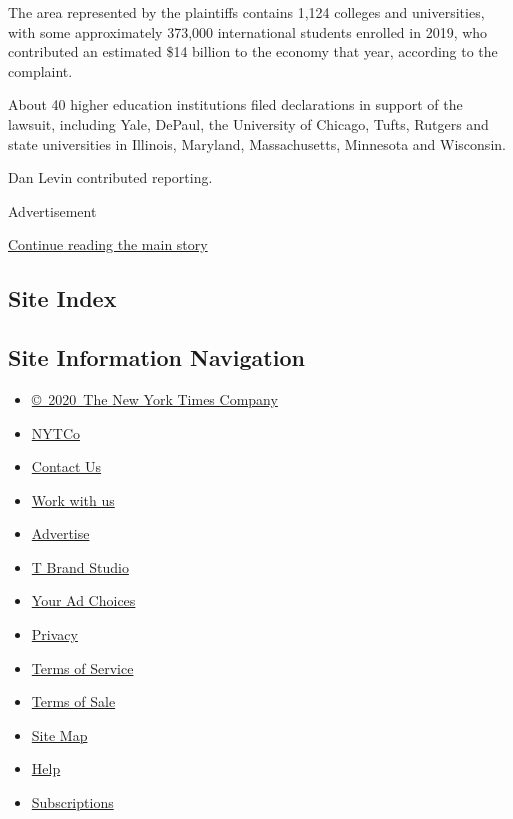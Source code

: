 The area represented by the plaintiffs contains 1,124 colleges and
universities, with some approximately 373,000 international students
enrolled in 2019, who contributed an estimated \$14 billion to the
economy that year, according to the complaint.

About 40 higher education institutions filed declarations in support of
the lawsuit, including Yale, DePaul, the University of Chicago, Tufts,
Rutgers and state universities in Illinois, Maryland, Massachusetts,
Minnesota and Wisconsin.

Dan Levin contributed reporting.

Advertisement

\protect\hyperlink{after-bottom}{Continue reading the main story}

\hypertarget{site-index}{%
\subsection{Site Index}\label{site-index}}

\hypertarget{site-information-navigation}{%
\subsection{Site Information
Navigation}\label{site-information-navigation}}

\begin{itemize}
\tightlist
\item
  \href{https://help.nytimes.com/hc/en-us/articles/115014792127-Copyright-notice}{©~2020~The
  New York Times Company}
\end{itemize}

\begin{itemize}
\tightlist
\item
  \href{https://www.nytco.com/}{NYTCo}
\item
  \href{https://help.nytimes.com/hc/en-us/articles/115015385887-Contact-Us}{Contact
  Us}
\item
  \href{https://www.nytco.com/careers/}{Work with us}
\item
  \href{https://nytmediakit.com/}{Advertise}
\item
  \href{http://www.tbrandstudio.com/}{T Brand Studio}
\item
  \href{https://www.nytimes.com/privacy/cookie-policy\#how-do-i-manage-trackers}{Your
  Ad Choices}
\item
  \href{https://www.nytimes.com/privacy}{Privacy}
\item
  \href{https://help.nytimes.com/hc/en-us/articles/115014893428-Terms-of-service}{Terms
  of Service}
\item
  \href{https://help.nytimes.com/hc/en-us/articles/115014893968-Terms-of-sale}{Terms
  of Sale}
\item
  \href{https://spiderbites.nytimes.com}{Site Map}
\item
  \href{https://help.nytimes.com/hc/en-us}{Help}
\item
  \href{https://www.nytimes.com/subscription?campaignId=37WXW}{Subscriptions}
\end{itemize}
